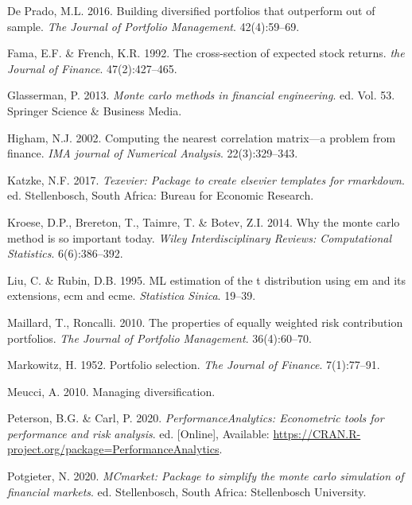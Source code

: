 \documentclass[11pt,preprint, authoryear]{elsarticle}
\numberwithin{equation}{section}
\numberwithin{figure}{section}
\numberwithin{table}{section}
\begin{document}
\leavevmode\hypertarget{ref-lopez}{}%
De Prado, M.L. 2016. Building diversified portfolios that outperform out
of sample. \emph{The Journal of Portfolio Management}. 42(4):59--69.

\leavevmode\hypertarget{ref-fama1992}{}%
Fama, E.F. \& French, K.R. 1992. The cross-section of expected stock
returns. \emph{the Journal of Finance}. 47(2):427--465.

\leavevmode\hypertarget{ref-glasserman2013}{}%
Glasserman, P. 2013. \emph{Monte carlo methods in financial
engineering}. ed. Vol. 53. Springer Science \& Business Media.

\leavevmode\hypertarget{ref-higham2002}{}%
Higham, N.J. 2002. Computing the nearest correlation matrix---a problem
from finance. \emph{IMA journal of Numerical Analysis}. 22(3):329--343.

\leavevmode\hypertarget{ref-Texevier}{}%
Katzke, N.F. 2017. \emph{Texevier: Package to create elsevier templates
for rmarkdown}. ed. Stellenbosch, South Africa: Bureau for Economic
Research.

\leavevmode\hypertarget{ref-kroese2014}{}%
Kroese, D.P., Brereton, T., Taimre, T. \& Botev, Z.I. 2014. Why the
monte carlo method is so important today. \emph{Wiley Interdisciplinary
Reviews: Computational Statistics}. 6(6):386--392.

\leavevmode\hypertarget{ref-liu1995}{}%
Liu, C. \& Rubin, D.B. 1995. ML estimation of the t distribution using
em and its extensions, ecm and ecme. \emph{Statistica Sinica}. 19--39.

\leavevmode\hypertarget{ref-maillard2010}{}%
Maillard, T., Roncalli. 2010. The properties of equally weighted risk
contribution portfolios. \emph{The Journal of Portfolio Management}.
36(4):60--70.

\leavevmode\hypertarget{ref-markowitz}{}%
Markowitz, H. 1952. Portfolio selection. \emph{The Journal of Finance}.
7(1):77--91.

\leavevmode\hypertarget{ref-meucci2010}{}%
Meucci, A. 2010. Managing diversification.

\leavevmode\hypertarget{ref-PerformanceAnalytics}{}%
Peterson, B.G. \& Carl, P. 2020. \emph{PerformanceAnalytics: Econometric
tools for performance and risk analysis}. ed. {[}Online{]}, Available:
\url{https://CRAN.R-project.org/package=PerformanceAnalytics}.

\leavevmode\hypertarget{ref-MCmarket}{}%
Potgieter, N. 2020. \emph{MCmarket: Package to simplify the monte carlo
simulation of financial markets}. ed. Stellenbosch, South Africa:
Stellenbosch University.
\end{document}
